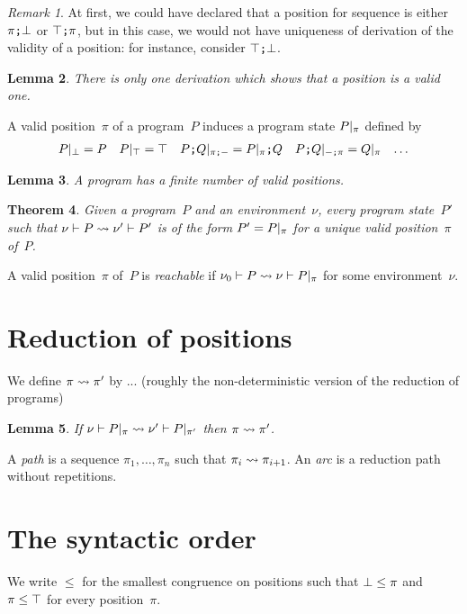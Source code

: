 \documentclass[a4paper]{article}
\theoremstyle{theorem}
\newtheorem{theorem}{Theorem}
\newtheorem{lemma}[theorem]{Lemma}
\theoremstyle{example}
\theoremstyle{remark}
\newtheorem{remark}[theorem]{Remark}
\begin{document}
\begin{remark}
  At first, we could have declared that a position for sequence is either
  $\pseq\pi\pbot$ or $\pseq\ptop\pi$, but in this case, we would not have
  uniqueness of derivation of the validity of a position: for instance, consider
  $\pseq\ptop\pbot$.
\end{remark}

\begin{lemma}
  There is only one derivation which shows that a position is a valid one.
  
\end{lemma}

A valid position~$\pi$ of a program~$P$ induces a program state $\postate\pi P$
defined by
\begin{align*}
  \postate\pbot P&=P
  &
  \postate\ptop P&=\pskip
  &
  \postate{\pseql\pi}{\pseq PQ}&=\pseq{\postate\pi P}Q
  &
  \postate{\pseqr\pi}{\pseq PQ}&=\postate\pi Q
  &
  \ldots
\end{align*}

\begin{lemma}
  A program has a finite number of valid positions.
\end{lemma}

\begin{theorem}
  Given a program~$P$ and an environment~$\nu$, every program state~$P'$ such
  that $\penv\nu P\redto\penv{\nu'}{P'}$ is of the form $P'=\postate\pi P$ for a
  unique valid position~$\pi$ of~$P$.
\end{theorem}

\noindent
A valid position~$\pi$ of~$P$ is \emph{reachable} if
$\penv{\nu_0} P\redto\penv\nu{\postate\pi P}$ for some environment~$\nu$.

\section{Reduction of positions}
We define $\pi\redto\pi'$ by ... (roughly the non-deterministic version of the
reduction of programs)

\begin{lemma}
  If $\penv\nu{\postate\pi P}\redto\penv{\nu'}{\postate{\pi'}P}$ then
  $\pi\redto\pi'$.
\end{lemma}

\noindent
A \emph{path} is a sequence $\pi_1,\ldots,\pi_n$ such that
$\pi_i\redto\pi_{i+1}$. An \emph{arc} is a reduction path without repetitions.

\section{The syntactic order}
We write $\leq$ for the smallest congruence on positions such that
$\pbot\leq\pi$ and $\pi\leq\ptop$ for every position~$\pi$.
\end{document}
